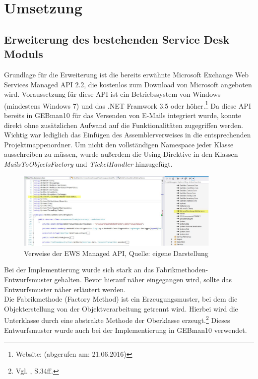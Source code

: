\section{Umsetzung}

\subsection{Erweiterung des bestehenden Service Desk Moduls}
\noindent
Grundlage für die Erweiterung ist die bereits erwähnte Microsoft Exchange Web Services Managed API 2.2, die kostenlos zum Download von Microsoft angeboten wird. Voraussetzung für diese API ist ein Betriebssystem von Windows (mindestens Windows 7) und das .NET Framwork 3.5 oder höher.\footnote{Website: \citeauthor{DownloadAPI} (abgerufen am: 21.06.2016)}\newline 
Da diese API bereits in GEBman10 für das Versenden von E-Mails integriert wurde, konnte direkt ohne zusätzlichen Aufwand auf die Funktionalitäten zugegriffen werden. Wichtig war lediglich das Einfügen des Assemblerverweises in die entsprechenden Projektmappenordner. Um nicht den vollständigen Namespace jeder Klasse ausschreiben zu müssen, wurde außerdem die Using-Direktive in den Klassen \textit{MailsToObjectsFactory} und \textit{TicketHandler} hinzugefügt.

\begin{figure}[h!]
\centering
\includegraphics[width=0.88\textwidth]{Abbildungen/Screenshot_Verweise.pdf}
	\caption[Verweise der EWS Managed API]{Verweise der EWS Managed API, Quelle: eigene Darstellung}
	\label{fig:Verweise}
\end{figure}

\noindent
Bei der Implementierung wurde sich stark an das Fabrikmethoden-Entwurfsmuster gehalten. Bevor hierauf näher eingegangen wird, sollte das Entwurfsmuster näher erläutert werden.\\
\noindent
Die Fabrikmethode (Factory Method) ist ein Erzeugungsmuster, bei dem die Objekterstellung von der Objektverarbeitung getrennt wird. Hierbei wird die Unterklasse durch eine abstrakte Methode der Oberklasse erzeugt.\footnote{Vgl. \citeauthor{PatternsKompakt} \citeyear{PatternsKompakt}, S.34ff.} Dieses Entwurfsmuster wurde auch bei der Implementierung in GEBman10 verwendet.\\ 

